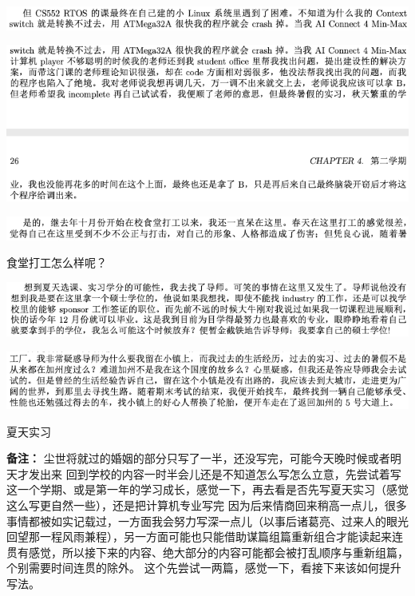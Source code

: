 \documentclass[9pt, b5paper]{article}
\begin{document}
\begin{center}
\includegraphics[width=.9\linewidth]{./pic/backups_plans_20210424_215728.png}
\end{center}

\begin{center}
\includegraphics[width=.9\linewidth]{./pic/backups_plans_20210424_215743.png}
\end{center}


\begin{center}
\includegraphics[width=.9\linewidth]{./pic/backups_plans_20210424_220650.png}
\end{center}

食堂打工怎么样呢？

\begin{center}
\includegraphics[width=.9\linewidth]{./pic/backups_plans_20210424_220153.png}
\end{center}

\begin{center}
\includegraphics[width=.9\linewidth]{./pic/backups_plans_20210424_220214.png}
\end{center}

夏天实习

\textbf{备注：}
尘世将就过的婚姻的部分只写了一半，还没写完，可能今天晚时候或者明天才发出来
回到学校的内容一时半会儿还是不知道怎么写怎么立意，先尝试着写这一个学期、或是第一年的学习成长，感觉一下，再去看是否先写夏天实习（感觉这么写更自然一些），还是把计算机专业写完
因为后来情商回来稍高一点儿，很多事情都被如实记载过，一方面我会努力写深一点儿（以事后诸葛亮、过来人的眼光回望那一程风雨兼程），另一方面可能也只能借助谋篇组篇重新组合才能读起来连贯有感觉，所以接下来的内容、绝大部分的内容可能都会被打乱顺序与重新组篇，个别需要时间连贯的除外。
这个先尝试一两篇，感觉一下，看接下来该如何提升写法。
\end{document}
